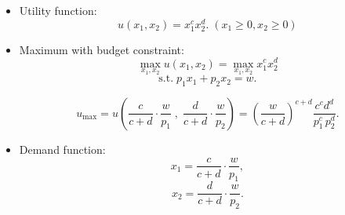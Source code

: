 \documentclass[
12pt, %
a4paper, %
onecolumn, %
portrait %
]{article}
\begin{document}
\begin{itemize}
	\item Utility function:
	\[
	u(x_1,x_2)=x_1^cx_2^d.\;(x_1\ge0,x_2\ge 0)
	\]
	
	\item Maximum with budget constraint:
	\[
	\max_{x_1,x_2} u(x_1,x_2)=\max_{x_1,x_2}x_1^cx_2^d
	\]
	\[
	\text{s.t.}\;p_1x_1+p_2x_2=w.
	\]
	
	\[
	u_{\max}=u\left(\frac{c}{c+d}\cdot\frac{w}{p_1}\;,\;\frac{d}{c+d}\cdot\frac{w}{p_2}\right)=\left(\frac{w}{c+d}\right)^{c+d}\frac{c^cd^d}{p_1^c\,p_2^d}.
	\]
	\item Demand function:
	\[
	x_1=\frac{c}{c+d}\cdot\frac{w}{p_1},
	\]
	\[
	x_2=\frac{d}{c+d}\cdot\frac{w}{p_2}.
	\]
	
\end{itemize}






\end{document}
